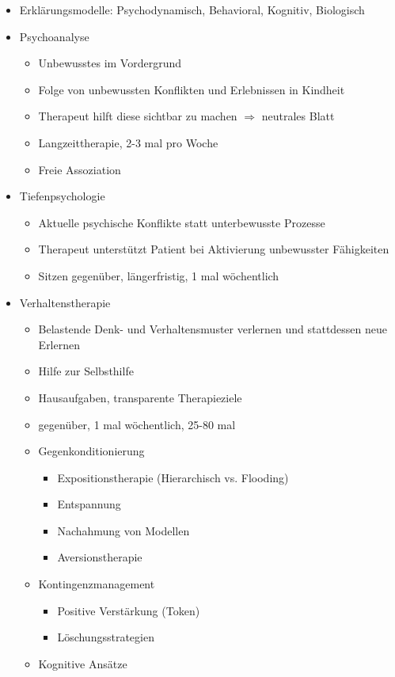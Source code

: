 \documentclass[11pt, paper=a4, twocolumn]{scrartcl}
\begin{document}
	\begin{itemize}
		\item Erklärungsmodelle: Psychodynamisch, Behavioral, Kognitiv, Biologisch

		\item Psychoanalyse
			\begin{itemize}
				\item Unbewusstes im Vordergrund
				\item Folge von unbewussten Konflikten und Erlebnissen in 
					Kindheit
				\item Therapeut hilft diese sichtbar zu machen 
					$\Rightarrow$ neutrales Blatt
				\item Langzeittherapie, 2-3 mal pro Woche
				\item Freie Assoziation
			\end{itemize}

		\item Tiefenpsychologie
			\begin{itemize}
				\item Aktuelle psychische Konflikte statt unterbewusste 
					Prozesse
				\item Therapeut unterstützt Patient bei Aktivierung 
					unbewusster Fähigkeiten
				\item Sitzen gegenüber, längerfristig, 1 mal 
					wöchentlich
			\end{itemize}

		\item Verhaltenstherapie
			\begin{itemize}
				\item Belastende Denk- und Verhaltensmuster verlernen und 
					stattdessen neue Erlernen
				\item Hilfe zur Selbsthilfe
				\item Hausaufgaben, transparente Therapieziele
				\item gegenüber, 1 mal wöchentlich, 25-80 mal
				\item Gegenkonditionierung
					\begin{itemize}
						\item Expositionstherapie (Hierarchisch 
							vs. Flooding)
						\item Entspannung
						\item Nachahmung von Modellen
						\item Aversionstherapie
					\end{itemize}
				\item Kontingenzmanagement
					\begin{itemize}
						\item Positive Verstärkung (Token)
						\item Löschungsstrategien
					\end{itemize}
				\item Kognitive Ansätze
			\end{itemize}


\end{itemize}
\end{document}
